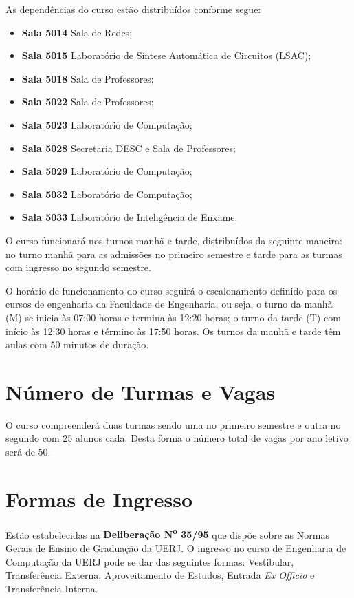 As dependências do curso estão distribuídos conforme segue:
\begin{itemize}
    \item \textbf{Sala 5014} Sala de Redes;
    \item \textbf{Sala 5015} Laboratório de Síntese Automática de Circuitos (LSAC);
    \item \textbf{Sala 5018} Sala de Professores;
    \item \textbf{Sala 5022} Sala de Professores;
    \item \textbf{Sala 5023} Laboratório de Computação;
    \item \textbf{Sala 5028} Secretaria DESC e Sala de Professores;
    \item \textbf{Sala 5029} Laboratório de Computação;
    \item \textbf{Sala 5032} Laboratório de Computação;
    \item \textbf{Sala 5033} Laboratório de Inteligência de Enxame.
\end{itemize}

O curso funcionará nos turnos manhã e tarde, distribuídos da seguinte maneira: no turno manhã para as admissões no primeiro semestre e tarde para as turmas com ingresso no segundo semestre.

O horário de funcionamento do curso seguirá o escalonamento definido para os cursos de engenharia da Faculdade de Engenharia, ou seja, o turno da manhã (M) se inicia às 07:00 horas e termina às 12:20 horas; o turno da tarde (T) com início às 12:30 horas e término às 17:50 horas. Os turnos da manhã e tarde têm aulas com 50 minutos de duração.

\section{Número de Turmas e Vagas}

O curso compreenderá duas turmas sendo uma no primeiro semestre e outra no segundo com 25 alunos cada. Desta forma o número total de vagas por ano letivo será de 50.


\section{Formas de Ingresso}
\label{sec:forma-ingresso}
Estão estabelecidas na \textbf{Deliberação N\textsuperscript{o} 35/95} que dispõe sobre as Normas Gerais de Ensino de Graduação da UERJ. O ingresso no curso de Engenharia de Computação da UERJ pode se dar das seguintes formas: Vestibular, Transferência Externa, Aproveitamento de Estudos, Entrada \textit{Ex Officio} e Transferência Interna.

